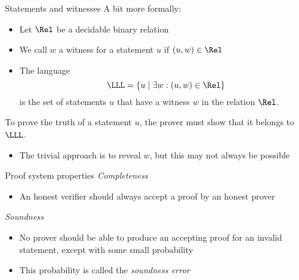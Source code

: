\begin{frame}{Statements and witnesses}
  A bit more formally:
  \begin{itemize}[<+(1)->]
    \item Let $\Rel$ be a decidable binary relation
    \item We call $w$ a witness for a statement $u$ if $(u, w) \in \Rel$
    \item The language
    \[
      \LLL = \{u \mid \exists w : (u, w) \in \Rel\}
    \]
    is the set of statements $u$ that have a witness $w$ in the relation $\Rel$.
  \end{itemize}

  \vfill

  \pause
  To prove the truth of a statement $u$, the prover must show that it belongs to $\LLL$.
  \begin{itemize}[<+(1)->]
    \item The trivial approach is to reveal $w$, but this may not always be possible
  \end{itemize}
\end{frame}

\begin{frame}{Proof system properties}
  \pause
  \emph{Completeness}
  \begin{itemize}[<+(1)->]
    \item An honest verifier should always accept a proof by an honest prover
  \end{itemize}

  \vspace*{1em}

  \pause
  \emph{Soundness}
  \begin{itemize}[<+(1)->]
    \item No prover should be able to produce an accepting proof for an invalid statement, except with some small probability
    \item This probability is called the \emph{soundness error}
  \end{itemize}
\end{frame}

